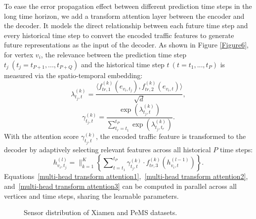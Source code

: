 \documentclass[letterpaper]{article} \usepackage{aaai20}  \usepackage{times}  \usepackage{helvet} \usepackage{courier}  \usepackage[hyphens]{url}  \usepackage{graphicx} \usepackage{amsmath}
\begin{document}
To ease the error propagation effect between different prediction time steps in the long time horizon, we add a transform attention layer between the encoder and the decoder. It models the direct relationship between each future time step and every historical time step to convert the encoded traffic features to generate future representations as the input of the decoder. As shown in Figure \ref{Figure6}, for vertex $ v_i $, the relevance between the prediction time step $ t_j \ ( t_j = t_{P + 1}, ..., t_{P + Q} ) $ and the historical time step $ t \ ( t = t_1, ..., t_P ) $ is measured via the spatio-temporal embedding:
\begin{equation}
\lambda_{t_j,t}^{(k)} = \dfrac{ \langle f_{tr,1}^{(k)} ( e_{v_i,t_j} ),  f_{tr,2}^{(k)} ( e_{v_i,t} ) \rangle }{\sqrt{d}} 
\label{multi-head transform attention1}, 
\end{equation}
\begin{equation}
\gamma_{t_j,t}^{(k)} = \dfrac{ \exp ( \lambda_{t_j,t}^{(k)} ) }{ \sum_{t_r = t_1}^{t_P} \exp ( \lambda_{t_j,t_r}^{(k)} ) } 
\label{multi-head transform attention2}.
\end{equation}
With the attention score $ \gamma_{t_j,t}^{(k)} $, the encoded traffic feature is transformed to the decoder by adaptively selecting relevant features across all historical $ P $ time steps:
\begin{equation}
h_{v_i,t_j}^{(l)} = \parallel_{k = 1}^K \left\{ \sum\nolimits_{t = t_1}^{t_P} \gamma_{t_j,t}^{(k)} \cdot f_{tr,3}^{(k)} ( h_{v_i,t}^{(l-1)} ) \right\} 
\label{multi-head transform attention3}.
\end{equation}
Equations~\ref{multi-head transform attention1},~\ref{multi-head transform attention2}, and~\ref{multi-head transform attention3} can be computed in parallel across all vertices and time steps, sharing the learnable parameters.

\begin{figure}
	\centering
	\caption{Sensor distribution of Xiamen and PeMS datasets.}
	\label{Figure7} 
\end{figure}
\end{document}
